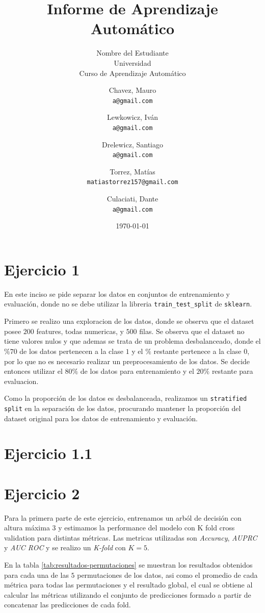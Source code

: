 \documentclass[10pt,a4paper]{article}
\title{Informe de Aprendizaje Automático}
\author{Nombre del Estudiante \\ Universidad \\ Curso de Aprendizaje Automático}
\author{
    Chavez, Mauro \\
    \texttt{a@gmail.com}
    \and
    Lewkowicz, Iván \\
    \texttt{a@gmail.com}
    \and
    Drelewicz, Santiago \\
    \texttt{a@gmail.com}
    \and
    Torrez, Matías \\
    \texttt{matiastorrez157@gmail.com}
    \and
    Culaciati, Dante \\
    \texttt{a@gmail.com}
}
\date{\today}
\begin{document}
\maketitle

\newpage

\section{Ejercicio 1}
\par En este inciso se pide separar los datos en conjuntos de entrenamiento y evaluación, donde no se debe utilizar la libreria \texttt{train\_test\_split} de \texttt{sklearn}.

\par Primero se realizo una exploracion de los datos, donde se observa que el dataset posee $200$ features, todas numericas, y $500$ filas.
Se observa que el dataset no tiene valores nulos y que ademas se trata de un problema desbalanceado, donde el $\%70$ de los datos pertenecen a la clase $1$ y el $\%$ restante pertenece a la clase $0$, por lo que no es necesario realizar un preprocesamiento de los datos. 
Se decide entonces utilizar el $80\%$ de los datos para entrenamiento y el $20\%$ restante para evaluacion.

\par Como la proporción de los datos es desbalanceada, realizamos un \texttt{stratified split} en la separación de los datos, procurando mantener la proporción del dataset original para los datos de entrenamiento y evaluación. 

\section{Ejercicio 1.1}
\section{Ejercicio 2}
\par Para la primera parte de este ejercicio, entrenamos un arból de decisión con altura máxima 3 y estimamos la performance del modelo con K fold cross validation para distintas métricas. 
Las metricas utilizadas son \textit{Accuracy}, \textit{AUPRC} y \textit{AUC ROC} y se realizo un \textit{K-fold} con $K=5$.
\par En la tabla \ref{tab:resultados-permutaciones} se muestran los resultados obtenidos para cada una de las $5$ permutaciones de los datos, asi como el promedio de cada métrica para todas las permutaciones y el resultado global,
el cual se obtiene al calcular las métricas utilizando el conjunto de predicciones formado a partir de concatenar las predicciones de cada fold.
\end{document}
